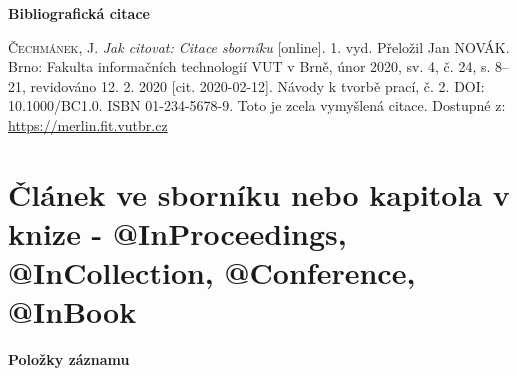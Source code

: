 \bigskip

\noindent \textbf{Bibliografická citace}

\medskip

\noindent \textsc{Čechmánek}, J. \textit{Jak citovat: Citace sborníku} [online]. 1. vyd. Přeložil Jan NOVÁK.
Brno: Fakulta informačních technologií VUT v Brně, únor 2020, sv. 4, č. 24, s. 8–21, revidováno 12. 2. 2020 [cit. 2020-02-12]. Návody k tvorbě prací, č. 2. DOI: 10.1000/BC1.0. ISBN 01-234-5678-9. Toto je zcela vymyšlená citace. Dostupné z: \url{https://merlin.fit.vutbr.cz}
\newpage
\section*{Článek ve sborníku nebo kapitola v knize - @InProceedings, @InCollection, @Conference, @InBook}
\label{pr-kapitola}
\noindent \textbf{Položky záznamu}

\medskip

